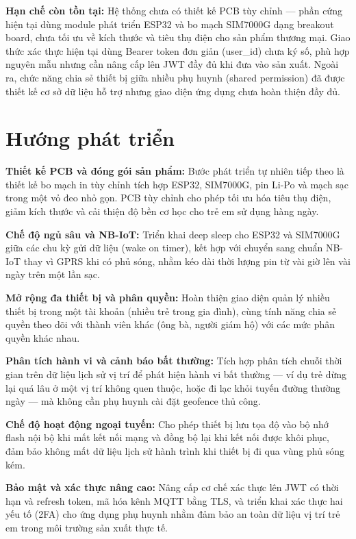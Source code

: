\documentclass[../DoAn.tex]{subfiles}
\begin{document}
\textbf{Hạn chế còn tồn tại:} Hệ thống chưa có thiết kế PCB tùy chỉnh — phần cứng hiện tại dùng module phát triển ESP32 và bo mạch SIM7000G dạng breakout board, chưa tối ưu về kích thước và tiêu thụ điện cho sản phẩm thương mại. Giao thức xác thực hiện tại dùng Bearer token đơn giản (user\_id) chưa ký số, phù hợp nguyên mẫu nhưng cần nâng cấp lên JWT đầy đủ khi đưa vào sản xuất. Ngoài ra, chức năng chia sẻ thiết bị giữa nhiều phụ huynh (shared permission) đã được thiết kế cơ sở dữ liệu hỗ trợ nhưng giao diện ứng dụng chưa hoàn thiện đầy đủ.

\section{Hướng phát triển}
\label{section:6.2}

\textbf{Thiết kế PCB và đóng gói sản phẩm:} Bước phát triển tự nhiên tiếp theo là thiết kế bo mạch in tùy chỉnh tích hợp ESP32, SIM7000G, pin Li-Po và mạch sạc trong một vỏ đeo nhỏ gọn. PCB tùy chỉnh cho phép tối ưu hóa tiêu thụ điện, giảm kích thước và cải thiện độ bền cơ học cho trẻ em sử dụng hàng ngày.

\textbf{Chế độ ngủ sâu và NB-IoT:} Triển khai deep sleep cho ESP32 và SIM7000G giữa các chu kỳ gửi dữ liệu (wake on timer), kết hợp với chuyển sang chuẩn NB-IoT thay vì GPRS khi có phủ sóng, nhằm kéo dài thời lượng pin từ vài giờ lên vài ngày trên một lần sạc.

\textbf{Mở rộng đa thiết bị và phân quyền:} Hoàn thiện giao diện quản lý nhiều thiết bị trong một tài khoản (nhiều trẻ trong gia đình), cùng tính năng chia sẻ quyền theo dõi với thành viên khác (ông bà, người giám hộ) với các mức phân quyền khác nhau.

\textbf{Phân tích hành vi và cảnh báo bất thường:} Tích hợp phân tích chuỗi thời gian trên dữ liệu lịch sử vị trí để phát hiện hành vi bất thường — ví dụ trẻ dừng lại quá lâu ở một vị trí không quen thuộc, hoặc đi lạc khỏi tuyến đường thường ngày — mà không cần phụ huynh cài đặt geofence thủ công.

\textbf{Chế độ hoạt động ngoại tuyến:} Cho phép thiết bị lưu tọa độ vào bộ nhớ flash nội bộ khi mất kết nối mạng và đồng bộ lại khi kết nối được khôi phục, đảm bảo không mất dữ liệu lịch sử hành trình khi thiết bị đi qua vùng phủ sóng kém.

\textbf{Bảo mật và xác thực nâng cao:} Nâng cấp cơ chế xác thực lên JWT có thời hạn và refresh token, mã hóa kênh MQTT bằng TLS, và triển khai xác thực hai yếu tố (2FA) cho ứng dụng phụ huynh nhằm đảm bảo an toàn dữ liệu vị trí trẻ em trong môi trường sản xuất thực tế.
\end{document}
